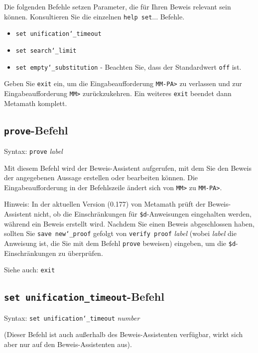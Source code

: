 Die folgenden Befehle setzen Parameter, die für Ihren Beweis relevant sein können. Konsultieren Sie die einzelnen \texttt{help set}... Befehle. \begin{itemize}
   \item[] \texttt{set unification{\char`\_}timeout}
 \item[]
    \texttt{set search{\char`\_}limit}
  \item[]
    \texttt{set empty{\char`\_}substitution} - Beachten Sie, dass der Standardwert \texttt{off} ist.
\end{itemize}

Geben Sie \texttt{exit} ein, um die Eingabeaufforderung \texttt{MM-PA>} zu verlassen und zur Eingabeaufforderung \texttt{MM>} zurückzukehren. Ein weiteres \texttt{exit} beendet dann Metamath komplett.


\subsection{\texttt{prove}-Befehl}

Syntax:  \texttt{prove} {\em label}

Mit diesem Befehl wird der Beweis-Assistent aufgerufen, mit dem Sie den Beweis der angegebenen Aussage erstellen oder bearbeiten können. Die Eingabeaufforderung in der Befehlszeile ändert sich von \texttt{MM>} zu \texttt{MM-PA>}.

Hinweis: In der aktuellen Version (0.177) von Metamath prüft der Beweis-Assistent nicht, ob die Einschränkungen für \texttt{\$d}-Anweisungen eingehalten werden, während ein Beweis erstellt wird.  Nachdem Sie einen Beweis abgeschlossen haben, sollten Sie \texttt{save new{\char`\_}proof} gefolgt von \texttt{verify proof} {\em label} (wobei {\em label} die Anweisung ist, die Sie mit dem Befehl \texttt{prove} beweisen) eingeben, um die \texttt{\$d}-Einschränkungen zu überprüfen.

Siehe auch: \texttt{exit}


\subsection{\texttt{set unification\_timeout}-Befehl}

Syntax:  \texttt{set unification{\char`\_}timeout} {\em number}

(Dieser Befehl ist auch außerhalb des Beweis-Assistenten verfügbar, wirkt sich aber nur auf den Beweis-Assistenten aus).

